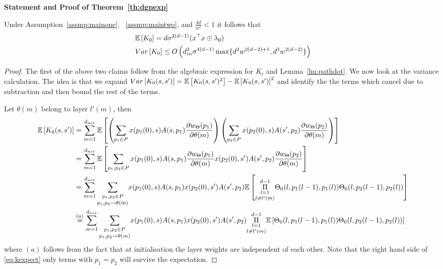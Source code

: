 \textbf{Statement and Proof of Theorem~\ref{th:dgnexp}}
\begin{theorem}
Under Assumption~\ref{assmp:mainone}, ~\ref{assmp:maintwo}, and $\frac{4d}{w^2}<1$ it follows that
 \begin{align*}
&\mathbb{E}\left[K_0\right]=d\sigma^{2(d-1)}(x^\top x \odot \lambda_0)\\
&Var\left[K_0\right]\leq O\left(d^2_{in}\sigma^{4(d-1)}\max\{d^2w^{2(d-2)+1}, d^3w^{2(d-2)}\}\right)
\end{align*}
\end{theorem}

\begin{proof}
The first of the above two claims follow from the algebraic expression for $K_t$ and Lemma~\ref{lm:pathdot}. We now look at the variance calculation. The idea is that we expand  $Var\left[K_0(s,s')\right]=\mathbb{E}\left[K_0(s,s')^2\right] -\mathbb{E}\left[K_0(s,s')\right]^2$ and identify the the terms which cancel due to subtraction and then bound the rest of the terms.%

Let $\theta(m)$ belong to layer $l'(m)$, then 
\begin{align}\label{eq:kexpect}
\mathbb{E}\left[K_0(s,s')\right]&=\sum_{m=1}^{d_{net}}\mathbb{E}\left[\left(\sum_{p_1 \in P}x(p_1(0),s)A(s,p_1)\frac{\partial w_{{\Theta}}(p_1)}{\partial \theta(m)}\right)\left(\sum_{p_2\in P}x(p_2(0),s)A(s',p_2)\frac{\partial w_{{\Theta}}(p_2)}{\partial \theta(m)}\right)\right]\nonumber\\
&=\sum_{m=1}^{d_{net}}\mathbb{E}\left[\sum_{p_1,p_2\in P}x(p_1(0),s)A(s,p_1)\frac{\partial w_{{\Theta}}(p_1)}{\partial \theta(m)}x(p_2(0),s')A(s',p_2)\frac{\partial w_{{\Theta}}(p_2)}{\partial \theta(m)}\right]\nonumber\\
&=\sum_{m=1}^{d_{net}}\underset{p_1,p_2\rightsquigarrow\theta(m)}{\sum_{p_1,p_2\in P}}x(p_1(0),s)A(s,p_1)x(p_2(0),s')A(s',p_2) \mathbb{E}\left[\underset{l\neq l'(m)}{\underset{l=1}{\overset{d-1}{\Pi}}} {\Theta}_0(l,p_1(l-1),p_1(l)) {\Theta}_0(l,p_2(l-1),p_2(l))\right]\nonumber\\
&\stackrel{(a)}=\sum_{m=1}^{d_{net}}\underset{p_1,p_2\rightsquigarrow\theta(m)}{\sum_{p_1,p_2\in P}}x(p_1(0),s)A(s,p_1)x(p_2(0),s')A(s',p_2) \underset{l\neq l'(m)}{\underset{l=1}{\overset{d-1}{\Pi}}} \mathbb{E}\left[{\Theta}_0(l,p_1(l-1),p_1(l)) {\Theta}_0(l,p_2(l-1),p_2(l))\right]
\end{align}
where $(a)$ follows from the fact that at initialisation the layer weights are independent of each other. Note that the right hand side of \eqref{eq:kexpect} only terms with $p_1=p_2$ will survive the expectation.


\end{proof}
